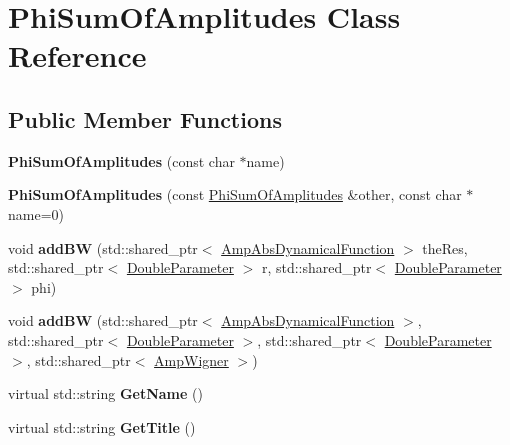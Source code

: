 \hypertarget{class_phi_sum_of_amplitudes}{\section{Phi\-Sum\-Of\-Amplitudes Class Reference}
\label{class_phi_sum_of_amplitudes}
}
\subsection*{Public Member Functions}
\begin{DoxyCompactItemize}
\item 
\hypertarget{class_phi_sum_of_amplitudes_aa744e569718b2c1961f6764e919b9a9e}{{\bfseries Phi\-Sum\-Of\-Amplitudes} (const char $\ast$name)}\label{class_phi_sum_of_amplitudes_aa744e569718b2c1961f6764e919b9a9e}

\item 
\hypertarget{class_phi_sum_of_amplitudes_a8746d8daf1163cc187bc0e162ce49cbd}{{\bfseries Phi\-Sum\-Of\-Amplitudes} (const \hyperlink{class_phi_sum_of_amplitudes}{Phi\-Sum\-Of\-Amplitudes} \&other, const char $\ast$name=0)}\label{class_phi_sum_of_amplitudes_a8746d8daf1163cc187bc0e162ce49cbd}

\item 
\hypertarget{class_phi_sum_of_amplitudes_a59d5ceab251ffe33c195a889893ab019}{void {\bfseries add\-B\-W} (std\-::shared\-\_\-ptr$<$ \hyperlink{class_amp_abs_dynamical_function}{Amp\-Abs\-Dynamical\-Function} $>$ the\-Res, std\-::shared\-\_\-ptr$<$ \hyperlink{class_double_parameter}{Double\-Parameter} $>$ r, std\-::shared\-\_\-ptr$<$ \hyperlink{class_double_parameter}{Double\-Parameter} $>$ phi)}\label{class_phi_sum_of_amplitudes_a59d5ceab251ffe33c195a889893ab019}

\item 
\hypertarget{class_phi_sum_of_amplitudes_a49a721f16f06e1914af1f0547079abfd}{void {\bfseries add\-B\-W} (std\-::shared\-\_\-ptr$<$ \hyperlink{class_amp_abs_dynamical_function}{Amp\-Abs\-Dynamical\-Function} $>$, std\-::shared\-\_\-ptr$<$ \hyperlink{class_double_parameter}{Double\-Parameter} $>$, std\-::shared\-\_\-ptr$<$ \hyperlink{class_double_parameter}{Double\-Parameter} $>$, std\-::shared\-\_\-ptr$<$ \hyperlink{class_amp_wigner}{Amp\-Wigner} $>$)}\label{class_phi_sum_of_amplitudes_a49a721f16f06e1914af1f0547079abfd}

\item 
\hypertarget{class_phi_sum_of_amplitudes_a3a71ce9207dfbb5b1455bd2ecb01f856}{virtual std\-::string {\bfseries Get\-Name} ()}\label{class_phi_sum_of_amplitudes_a3a71ce9207dfbb5b1455bd2ecb01f856}

\item 
\hypertarget{class_phi_sum_of_amplitudes_aa46cecd2a5df57f61176e7eee63861f9}{virtual std\-::string {\bfseries Get\-Title} ()}\label{class_phi_sum_of_amplitudes_aa46cecd2a5df57f61176e7eee63861f9}

\end{DoxyCompactItemize}
